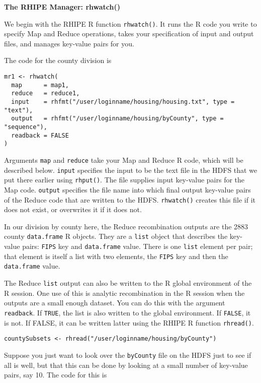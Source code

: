 \textbf{The RHIPE Manager: rhwatch()}

We begin with the RHIPE R function \texttt{rhwatch()}. It
runs the R code you write to specify
Map and Reduce operations, takes your specification of input and
output files, and manages key-value pairs for you.

The code for the county division is

\begin{verbatim}
mr1 <- rhwatch(
  map      = map1,
  reduce   = reduce1,
  input    = rhfmt("/user/loginname/housing/housing.txt", type = "text"),
  output   = rhfmt("/user/loginname/housing/byCounty", type = "sequence"),
  readback = FALSE
)
\end{verbatim}

Arguments \texttt{map} and \texttt{reduce} take your Map and Reduce R code, which will be
described below. \texttt{input} specifies the input to be the text file in the HDFS
that we put there earlier using \texttt{rhput()}. The file supplies input key-value
pairs for the Map code.  \texttt{output} specifies the file name
into which final output key-value pairs of the Reduce code that are written to
the HDFS. \texttt{rhwatch()} creates this file if it does not exist, or overwrites it
if it does not.

In our division by county here, the Reduce recombination outputs are the
2883 county \texttt{data.frame} R objects. They are a \texttt{list} object that describes the
key-value pairs: \texttt{FIPS} key and \texttt{data.frame} value. There is one \texttt{list} element
per pair; that element is itself a list with two elements, the \texttt{FIPS} key and
then the \texttt{data.frame} value.

The Reduce \texttt{list} output can also be written to the R global environment of
the R session. One use of this is analytic recombination in the R session
when the outputs are a small enough dataset. You can do this with the argument
\texttt{readback}.  If \texttt{TRUE}, the list is also written to the global environment.
If \texttt{FALSE}, it is not. If FALSE, it can be written latter using the RHIPE R
function \texttt{rhread()}.

\begin{verbatim}
countySubsets <- rhread("/user/loginname/housing/byCounty")
\end{verbatim}

Suppose you just want to look over the \texttt{byCounty} file on the HDFS just to see
if all is well, but that this can be done by looking at a small number of
key-value pairs, say 10. The code for this is

